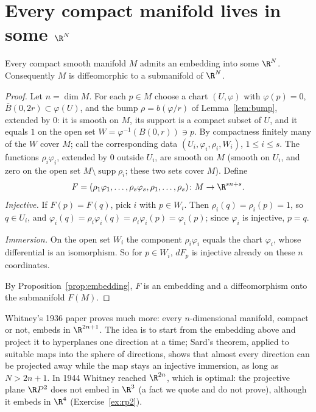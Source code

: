 \section{Every compact manifold lives in some \texorpdfstring{$\R^N$}{R\^{}N}}

\begin{theorem}\label{thm:whitney}
Every compact smooth manifold $M$ admits an embedding into some $\R^N$. Consequently $M$ is diffeomorphic to a submanifold of $\R^N$.
\end{theorem}
\begin{proof}
Let $n=\dim M$. For each $p\in M$ choose a chart $(U,\varphi)$ with $\varphi(p)=0$, $\bar B(0,2r)\subset\varphi(U)$, and the bump $\rho=b(\varphi/r)$ of
Lemma~\ref{lem:bump}, extended by $0$: it is smooth on $M$, its support is a compact subset of $U$, and it equals $1$ on the open set
$W=\varphi^{-1}(B(0,r))\ni p$. By compactness finitely many of the $W$ cover $M$; call the corresponding data $(U_i,\varphi_i,\rho_i,W_i)$, $1\le i\le s$.
The functions $\rho_i\varphi_i$, extended by $0$ outside $U_i$, are smooth on $M$ (smooth on $U_i$, and zero on the open set $M\setminus\operatorname{supp}\rho_i$;
these two sets cover $M$). Define
\[
F=(\rho_1\varphi_1,\dots,\rho_s\varphi_s,\rho_1,\dots,\rho_s)\colon M\to\R^{sn+s}.
\]
\emph{Injective.} If $F(p)=F(q)$, pick $i$ with $p\in W_i$. Then $\rho_i(q)=\rho_i(p)=1$, so $q\in U_i$, and
$\varphi_i(q)=\rho_i\varphi_i(q)=\rho_i\varphi_i(p)=\varphi_i(p)$; since $\varphi_i$ is injective, $p=q$.

\emph{Immersion.} On the open set $W_i$ the component $\rho_i\varphi_i$ equals the chart $\varphi_i$, whose differential is an isomorphism. So for
$p\in W_i$, $dF_p$ is injective already on these $n$ coordinates.

By Proposition~\ref{prop:embedding}, $F$ is an embedding and a diffeomorphism onto the submanifold $F(M)$.
\end{proof}

\begin{remark}
Whitney's 1936 paper proves much more: every $n$-dimensional manifold, compact or not, embeds in $\R^{2n+1}$. The idea is to start from the embedding above
and project it to hyperplanes one direction at a time; Sard's theorem, applied to suitable maps into the sphere of directions, shows that almost every
direction can be projected away while the map stays an injective immersion, as long as $N>2n+1$. In 1944 Whitney reached $\R^{2n}$, which is optimal: the
projective plane $\R P^2$ does not embed in $\R^3$ (a fact we quote and do not prove), although it embeds in $\R^4$ (Exercise~\ref{ex:rp2}).
\end{remark}


